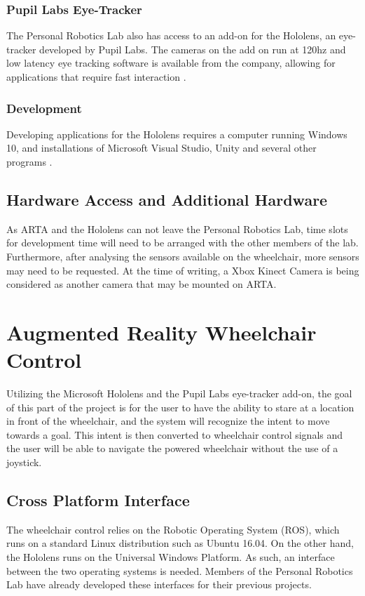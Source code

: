\documentclass[12pt,a4paper]{report}
\begin{document}
\subsubsection{Pupil Labs Eye-Tracker}
The Personal Robotics Lab also has access to an add-on for the Hololens, an eye-tracker developed by Pupil Labs. The cameras on the add on run at 120hz and low latency eye tracking software is available from the company, allowing for applications that require fast interaction \citep{PupilLabs}.

\subsubsection{Development}
Developing applications for the Hololens requires a computer running Windows 10, and installations of Microsoft Visual Studio, Unity and several other programs \citep{Microsofta}.

\subsection{Hardware Access and Additional Hardware}
As ARTA and the Hololens can not leave the Personal Robotics Lab, time slots for development time will need to be arranged with the other members of the lab. Furthermore, after analysing the sensors available on the wheelchair, more sensors may need to be requested. At the time of writing, a Xbox Kinect Camera is being considered as another camera that may be mounted on ARTA.


\section{Augmented Reality Wheelchair Control} \label{section:ARWC}
Utilizing the Microsoft Hololens and the Pupil Labs eye-tracker add-on, the goal of this part of the project is for the user to have the ability to stare at a location in front of the wheelchair, and the system will recognize the intent to move towards a goal. This intent is then converted to wheelchair control signals and the user will be able to navigate the powered wheelchair without the use of a joystick.

\subsection{Cross Platform Interface}
The wheelchair control relies on the Robotic Operating System (ROS), which runs on a standard Linux distribution such as Ubuntu 16.04. On the other hand, the Hololens runs on the Universal Windows Platform. As such, an interface between the two operating systems is needed. Members of the Personal Robotics Lab have already developed these interfaces for their previous projects.
\end{document}
